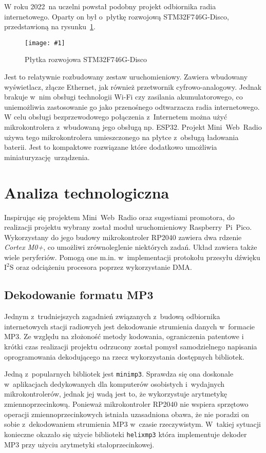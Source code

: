\documentclass[polish]{aghengthesis}
\newcommand{\imgint}[4]{
	\begin{figure}[{#4}]
		\centering
		\texttt{[image: \#1]}
		\caption{#2}
		\label{#1}
	\end{figure}
}
\newcommand{\imgh}[3]{\imgint{#1}{#2}{#3}{H}}
\newcommand{\isqs}{$\text{I}^{2}\text{S}$}
\begin{document}
		W roku 2022~na uczelni powstał podobny projekt odbiornika radia internetowego\textsuperscript{\cite{apd_radio2}}. Oparty on był o~płytkę rozwojową STM32F746G-Disco, przedstawioną na rysunku~\ref{1/botland_stm}. 
		\imgh{1/botland_stm}{Płytka rozwojowa STM32F746G-Disco\textsuperscript{\cite{botland_stm}}}{0.6}
		Jest to relatywnie rozbudowany zestaw uruchomieniowy. Zawiera wbudowany wyświetlacz, złącze Ethernet, jak również przetwornik cyfrowo-analogowy. Jednak brakuje w~nim obsługi technologii Wi-Fi czy zasilania akumulatorowego, co uniemożliwia zastosowanie go jako przenośnego odtwarzacza radia internetowego.
		$ $\\
		
		W celu obsługi bezprzewodowego połączenia z~Internetem można użyć mikrokontrolera z~wbudowaną jego obsługą np. ESP32. Projekt Mini~Web~Radio\textsuperscript{\cite{esp32_radio}} używa tego mikrokontrolera umieszczonego na płytce z~obsługą ładowania baterii. Jest to kompaktowe rozwiązane które dodatkowo umożliwia miniaturyzację urządzenia.
	
	\section{Analiza technologiczna}
		Inspirując się projektem Mini~Web~Radio oraz sugestiami promotora, do realizacji projektu wybrany został moduł uruchomieniowy Raspberry~Pi~Pico.
		Wykorzystany do jego budowy mikrokontroler RP2040\textsuperscript{\cite{rp2040}} zawiera dwa rdzenie \textit{Cortex M0+}, co umożliwi zrównoleglenie niektórych zadań.
		Układ zawiera także wiele peryferiów. Pomogą one m.in. w~implementacji protokołu przesyłu dźwięku \isqs{} oraz odciążeniu procesora poprzez wykorzystanie DMA.
		
		\subsection{Dekodowanie formatu MP3}
			Jednym z~trudniejszych zagadnień związanych z~budową odbiornika internetowych stacji radiowych jest dekodowanie strumienia danych w~formacie MP3. Ze względu na złożoność metody kodowania, ograniczenia patentowe i~ krótki czas realizacji projektu odrzucony został pomysł samodzielnego napisania oprogramowania dekodującego na rzecz wykorzystania dostępnych bibliotek.
			
			Jedną z~popularnych bibliotek jest \lstinline|minimp3|\textsuperscript{\cite{minimp3}}. Sprawdza się ona doskonale w~aplikacjach dedykowanych dla komputerów osobistych i~wydajnych mikrokontrolerów, jednak jej wadą jest to, że wykorzystuje arytmetykę zmiennoprzecinkową. Ponieważ mikrokontroler RP2040 nie wspiera sprzętowo operacji zmiennoprzecinkowych istniała uzasadniona obawa, że nie poradzi on sobie z~dekodowaniem strumienia MP3 w~czasie rzeczywistym. W~takiej sytuacji konieczne okazało się użycie  biblioteki \lstinline|helixmp3|\textsuperscript{\cite{helixmp3_repo}} która implementuje dekoder MP3 przy użyciu arytmetyki stałoprzecinkowej.
			$ $\\
			
\end{document}
